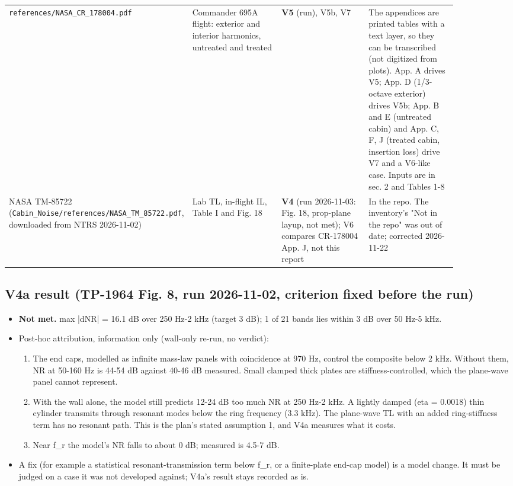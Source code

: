 \documentclass[10pt,a4paper]{article}
\begin{document}
{\begin{longtable}{>{\raggedright\arraybackslash}p{0.220\linewidth}>{\raggedright\arraybackslash}p{0.220\linewidth}>{\raggedright\arraybackslash}p{0.220\linewidth}>{\raggedright\arraybackslash}p{0.220\linewidth}}
\texttt{references/\allowbreak{}NASA\_\allowbreak{}CR\_\allowbreak{}178004.\allowbreak{}pdf} & Commander 695A flight: exterior and interior harmonics, untreated and treated & \textbf{V5} (run), V5b, V7 & The appendices are printed tables with a text layer, so they can be transcribed (not digitized from plots). App. A drives V5; App. D (1/3-octave exterior) drives V5b; App. B and E (untreated cabin) and App. C, F, J (treated cabin, insertion loss) drive V7 and a V6-like case. Inputs are in sec. 2 and Tables 1-8 \\
NASA TM-85722 (\texttt{Cabin\_\allowbreak{}Noise/\allowbreak{}references/\allowbreak{}NASA\_\allowbreak{}TM\_\allowbreak{}85722.\allowbreak{}pdf}, downloaded from NTRS 2026-11-02) & Lab TL, in-flight IL, Table I and Fig. 18 & \textbf{V4} (run 2026-11-03: Fig. 18, prop-plane layup, not met); V6 compares CR-178004 App. J, not this report & In the repo. The inventory's "Not in the repo" was out of date; corrected 2026-11-22 \\
\hline
\end{longtable}}

\subsection*{V4a result (TP-1964 Fig. 8, run 2026-11-02, criterion fixed before the run)}

\begin{itemize}
\item \textbf{Not met.} max |dNR| = 16.1 dB over 250 Hz-2 kHz (target 3 dB); 1 of 21 bands lies within 3 dB over 50 Hz-5 kHz.
\item Post-hoc attribution, information only (wall-only re-run, no verdict):
\begin{enumerate}
\item The end caps, modelled as infinite mass-law panels with coincidence at 970 Hz, control the composite below 2 kHz. Without them, NR at 50-160 Hz is 44-54 dB against 40-46 dB measured. Small clamped thick plates are stiffness-controlled, which the plane-wave panel cannot represent.
\item With the wall alone, the model still predicts 12-24 dB too much NR at 250 Hz-2 kHz. A lightly damped (eta = 0.0018) thin cylinder transmits through resonant modes below the ring frequency (3.3 kHz). The plane-wave TL with an added ring-stiffness term has no resonant path. This is the plan's stated assumption 1, and V4a measures what it costs.
\item Near f\_r the model's NR falls to about 0 dB; measured is 4.5-7 dB.
\end{enumerate}
\item A fix (for example a statistical resonant-transmission term below f\_r, or a finite-plate end-cap model) is a model change. It must be judged on a case it was not developed against; V4a's result stays recorded as is.
\end{itemize}
\end{document}

